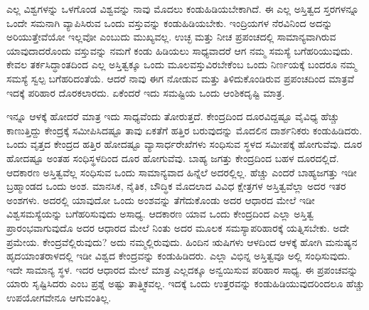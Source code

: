 \vskip 0.2cm 

ಎಲ್ಲ ವಿಶ್ವಗಳನ್ನು ಒಳಗೊಂಡ ವಿಶ್ವವನ್ನು ನಾವು ಮೊದಲು ಕಂಡುಹಿಡಿಯಬೇಕಾಗಿದೆ. ಈ ಎಲ್ಲ ಅಸ್ತಿತ್ವದ ಸ್ತರಗಳನ್ನೂ ಒಂದೇ ಸಮನಾಗಿ ವ್ಯಾಪಿಸಿರುವ ಒಂದು ವಸ್ತುವನ್ನು ಕಂಡುಹಿಡಿಯಬೇಕು. ಇಂದ್ರಿಯಗಳ ನೆರವಿನಿಂದ ಅದನ್ನು ಅರಿಯುತ್ತೇವೆಯೋ ಇಲ್ಲವೋ ಎಂಬುದು ಮುಖ್ಯವಲ್ಲ. ಉಚ್ಛ ಮತ್ತು ನೀಚ ಪ್ರಪಂಚದಲ್ಲಿ ಸಾಮಾನ್ಯವಾಗಿರುವ ಯಾವುದಾದರೊಂದು ವಸ್ತುವನ್ನು ನಮಗೆ ಕಂಡು ಹಿಡಿಯಲು ಸಾಧ್ಯವಾದರೆ ಆಗ ನಮ್ಮ ಸಮಸ್ಯೆ ಬಗೆಹರಿಯುವುದು. ಕೇವಲ ತರ್ಕಸಿದ್ಧಾಂತದಿಂದ ಎಲ್ಲ ಅಸ್ತಿತ್ವಕ್ಕೂ ಒಂದು ಮೂಲವಸ್ತುವಿರಬೇಕೆಂಬ ಒಂದು ನಿರ್ಣಯಕ್ಕೆ ಬಂದರೂ ನಮ್ಮ ಸಮಸ್ಯೆ ಸ್ವಲ್ಪ ಬಗೆಹರಿದಂತೆಯೆ. ಆದರೆ ನಾವು ಈಗ ನೋಡುವ ಮತ್ತು ತಿಳಿದುಕೊಂಡಿರುವ ಪ್ರಪಂಚದಿಂದ ಮಾತ್ರವೆ ಇದಕ್ಕೆ ಪರಿಹಾರ ದೊರಕಲಾರದು. ಏಕೆಂದರೆ ಇದು ಸಮಷ್ಟಿಯ ಒಂದು ಆಂಶಿಕದೃಷ್ಟಿ ಮಾತ್ರ.

\vskip 0.2cm 

ಇನ್ನೂ ಆಳಕ್ಕೆ ಹೋದರೆ ಮಾತ್ರ ಇದು ಸಾಧ್ಯವೆಂದು ತೋರುತ್ತದೆ. ಕೇಂದ್ರದಿಂದ ದೂರವಿದ್ದಷ್ಟೂ ವೈವಿಧ್ಯ ಹೆಚ್ಚು ಕಾಣುತ್ತಿದ್ದು ಕೇಂದ್ರಕ್ಕೆ ಸಮೀಪಿಸಿದಷ್ಟೂ ತಾವು ಏಕತೆಗೆ ಹತ್ತಿರ ಬರುವುದನ್ನು ಮೊದಲಿನ ದಾರ್ಶನಿಕರು ಕಂಡುಹಿಡಿದರು. ಒಂದು ವೃತ್ತದ ಕೇಂದ್ರದ ಹತ್ತಿರ ಹೋದಷ್ಟೂ ವ್ಯಾಸಾರ್ಧರೇಖೆಗಳು ಸಂಧಿಸುವ ಸ್ಥಳದ ಸಮೀಪಕ್ಕೆ ಹೋಗುವೆವು. ದೂರ ಹೋದಷ್ಟೂ ಅಂತಹ ಸಂಧಿಸ್ಥಳದಿಂದ ದೂರ ಹೋಗುವೆವು. ಬಾಹ್ಯ ಜಗತ್ತು ಕೇಂದ್ರದಿಂದ ಬಹಳ ದೂರದಲ್ಲಿದೆ. ಆದಕಾರಣ ಅಸ್ತಿತ್ವವೆಲ್ಲ ಸಂಧಿಸುವ ಒಂದು ಸಾಮಾನ್ಯವಾದ ಹಿನ್ನೆಲೆ ಅದರಲ್ಲಿಲ್ಲ. ಹೆಚ್ಚು ಎಂದರೆ ಬಾಹ್ಯಜಗತ್ತು ಇಡೀ ಬ್ರಹ್ಮಾಂಡದ ಒಂದು ಅಂಶ. ಮಾನಸಿಕ, ನೈತಿಕ, ಬೌದ್ಧಿಕ ಮೊದಲಾದ ವಿವಿಧ ಕ್ಷೇತ್ರಗಳ ಅಸ್ತಿತ್ವವೆಲ್ಲಾ ಅದರ ಇತರ ಅಂಶಗಳು. ಅದರಲ್ಲಿ ಯಾವುದೋ ಒಂದು ಅಂಶವನ್ನು ತೆಗೆದುಕೊಂಡು ಅದರ ಆಧಾರದ ಮೇಲೆ ಇಡೀ ವಿಶ್ವಸಮಸ್ಯೆಯನ್ನು ಬಗೆಹರಿಸುವುದು ಅಸಾಧ್ಯ. ಆದಕಾರಣ ಯಾವ ಒಂದು ಕೇಂದ್ರದಿಂದ ಎಲ್ಲಾ ಅಸ್ತಿತ್ವ ಪ್ರಾರಂಭವಾಗುವುದೊ ಅದರ ಆಧಾರದ ಮೇಲೆ ನಿಂತು ಅದರ ಮೂಲಕ ಸಮಸ್ಯಾಪರಿಹಾರಕ್ಕೆ ಯತ್ನಿಸಬೇಕು. ಅದೇ ಪ್ರಮೇಯ. ಕೇಂದ್ರವೆಲ್ಲಿರುವುದು? ಅದು ನಮ್ಮಲ್ಲಿರುವುದು. ಹಿಂದಿನ ಋಷಿಗಳು ಆಳದಿಂದ ಆಳಕ್ಕೆ ಹೋಗಿ ಮನುಷ್ಯನ ಹೃದಯಾಂತರಾಳದಲ್ಲಿ ಇಡೀ ವಿಶ್ವದ ಕೇಂದ್ರವನ್ನು ಕಂಡುಹಿಡಿದರು. ಎಲ್ಲಾ ವಿಭಿನ್ನ ಅಸ್ತಿತ್ವವೂ ಅಲ್ಲಿ ಸಂಧಿಸುವುದು. ಇದೇ ಸಾಮಾನ್ಯ ಸ್ಥಳ. ಇದರ ಆಧಾರದ ಮೇಲೆ ಮಾತ್ರ ಎಲ್ಲದಕ್ಕೂ ಅನ್ವಯಿಸುವ ಪರಿಹಾರ ಸಾಧ್ಯ. ಈ ಪ್ರಪಂಚವನ್ನು ಯಾರು ಸೃಷ್ಟಿಸಿದರು ಎಂಬ ಪ್ರಶ್ನೆ ಅಷ್ಟು ತಾತ್ತ್ವಿಕವಲ್ಲ. ಇದಕ್ಕೆ ಒಂದು ಉತ್ತರವನ್ನು ಕಂಡುಹಿಡಿಯುವುದರಿಂದಲೂ ಹೆಚ್ಚು ಉಪಯೋಗವೇನೂ ಆಗುವಂತಿಲ್ಲ.

\vskip 0.2cm 

